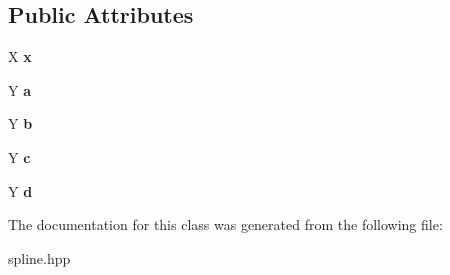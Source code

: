 \subsection*{Public Attributes}
\begin{DoxyCompactItemize}
\item 
\hypertarget{classSpline_1_1Element_a25cad79ff1314448e9af26e9842d72b8}{X {\bfseries x}}\label{classSpline_1_1Element_a25cad79ff1314448e9af26e9842d72b8}

\item 
\hypertarget{classSpline_1_1Element_a592445ec2cd3d32aaebfe290f7d875da}{Y {\bfseries a}}\label{classSpline_1_1Element_a592445ec2cd3d32aaebfe290f7d875da}

\item 
\hypertarget{classSpline_1_1Element_af109f201661f37626a794b1e3a55510a}{Y {\bfseries b}}\label{classSpline_1_1Element_af109f201661f37626a794b1e3a55510a}

\item 
\hypertarget{classSpline_1_1Element_ac07e9001f265749c4911309db45fd683}{Y {\bfseries c}}\label{classSpline_1_1Element_ac07e9001f265749c4911309db45fd683}

\item 
\hypertarget{classSpline_1_1Element_aea979df0cc618ad6b04c4aef4d8bcbb0}{Y {\bfseries d}}\label{classSpline_1_1Element_aea979df0cc618ad6b04c4aef4d8bcbb0}

\end{DoxyCompactItemize}


The documentation for this class was generated from the following file\-:\begin{DoxyCompactItemize}
\item 
spline.\-hpp\end{DoxyCompactItemize}
